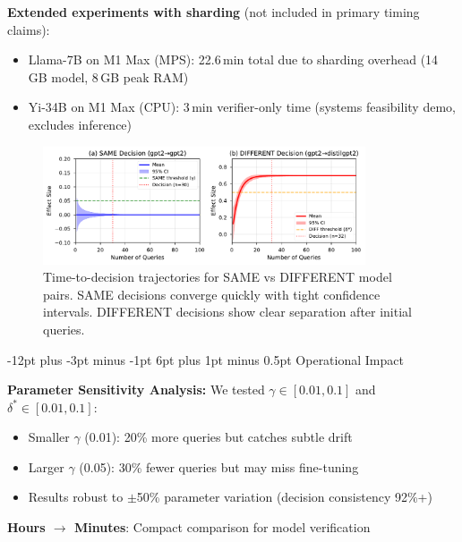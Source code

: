 \documentclass[11pt]{article}
\makeatletter
\renewcommand\subsection{\@startsection{subsection}{2}{\z@}%
  {-12pt plus -3pt minus -1pt}%
  {6pt plus 1pt minus 0.5pt}%
  {\normalfont\large\bfseries}}
\makeatother
\begin{document}
\textbf{Extended experiments with sharding} (not included in primary timing claims):
\begin{itemize}
\item Llama-7B on M1 Max (MPS): 22.6\,min total due to sharding overhead (14\,GB model, 8\,GB peak RAM)
\item Yi-34B on M1 Max (CPU): 3\,min verifier-only time (systems feasibility demo, excludes inference)
\end{itemize}

\begin{figure}[ht!]
\centering
\includegraphics[width=0.85\textwidth]{figures/fig1_time_to_decision.pdf}
\caption{Time-to-decision trajectories for SAME vs DIFFERENT model pairs. SAME decisions converge quickly with tight confidence intervals. DIFFERENT decisions show clear separation after initial queries.}
\label{fig:time-to-decision}
\end{figure}

\subsection{Operational Impact}

\textbf{Parameter Sensitivity Analysis:} We tested $\gamma \in [0.01, 0.1]$ and $\delta^* \in [0.01, 0.1]$:
\begin{itemize}
\item Smaller $\gamma$ (0.01): 20\% more queries but catches subtle drift
\item Larger $\gamma$ (0.05): 30\% fewer queries but may miss fine-tuning
\item Results robust to $\pm$50\% parameter variation (decision consistency 92\%+)
\end{itemize}

\textbf{Hours ${\to}$ Minutes}: Compact comparison for model verification
\end{document}
